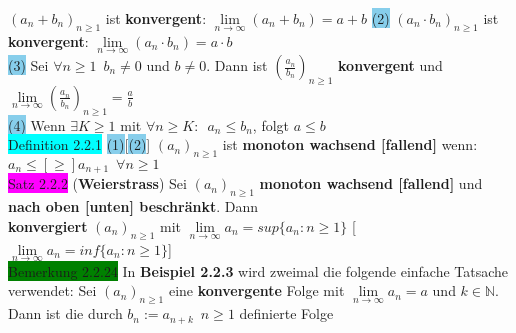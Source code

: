 \documentclass[10pt]{article}
\begin{document}
                \textcolor{NavyBlue}{$(a_n+b_n)_{n\geqslant 1}$} ist \textbf{konvergent}: 
                \textcolor{NavyBlue}{$\lim\limits_{n\to\infty}(a_n+b_n)=a+b$}
                \quad \colorbox{SkyBlue}{(2)} 
                \textcolor{NavyBlue}{$(a_n\cdot b_n)_{n\geqslant 1}$} ist \textbf{konvergent}: 
                \textcolor{NavyBlue}{$\lim\limits_{n\to\infty}(a_n\cdot b_n)=a\cdot b$}\\
        \indent \colorbox{SkyBlue}{(3)} Sei 
                \textcolor{NavyBlue}{$\forall n\geqslant 1\enspace b_n\neq 0$} und 
                \textcolor{NavyBlue}{$b\neq 0$}. 
                Dann ist \textcolor{NavyBlue}{$(\frac{a_n}{b_n})_{n\geqslant 1}$} 
                \textbf{konvergent} und 
                \textcolor{NavyBlue}{
                $\lim\limits_{n\to\infty}(\frac{a_n}{b_n})_{n\geqslant 1}=\frac{a}{b}$}\\
        \indent \colorbox{SkyBlue}{(4)} Wenn \textcolor{NavyBlue}{$\exists K\geqslant 1$} 
                mit \textcolor{NavyBlue}{$\forall n\geqslant K: \enspace a_n\leqslant b_n$}, 
                folgt \textcolor{NavyBlue}{$a\leqslant b$}\\
\colorbox{cyan}{Definition 2.2.1} \enspace \colorbox{SkyBlue}{(1)}[\colorbox{SkyBlue}{(2)}] 
                $(a_n)_{n\geqslant 1}$ ist \textbf{monoton
                wachsend [fallend]} wenn: \textcolor{NavyBlue}{
                $a_n\leqslant[\geqslant]a_{n+1}\enspace\forall n\geqslant1$}\\
\colorbox{magenta}{Satz 2.2.2} (\textbf{Weierstrass}) Sei 
                \textcolor{NavyBlue}{$(a_n)_{n\geqslant 1}$}
                \textbf{monoton wachsend 
                [fallend]} und \textbf{nach oben [unten] beschränkt}. Dann \\
        \indent \textbf{konvergiert} 
                \textcolor{NavyBlue}{$(a_n)_{n\geqslant 1}$} mit 
                \textcolor{NavyBlue}{$\lim\limits_{n\to\infty}a_n=sup\{a_n:n\geqslant 1\}$}
                [\textcolor{NavyBlue}{$\lim\limits_{n\to\infty}a_n=inf\{a_n:n\geqslant 1\}$}]\\
\colorbox{green}{Bemerkung 2.2.24} In \textbf{Beispiel 2.2.3} wird zweimal die 
                folgende einfache Tatsache verwendet: Sei 
                \textcolor{NavyBlue}{$(a_n)_{n\geqslant1}$} eine 
        \indent \textbf{konvergente} Folge mit 
                \textcolor{NavyBlue}{$\lim\limits_{n\to\infty}a_n=a$}
                und 
                \textcolor{NavyBlue}{$k\in\mathbb{N}$}. Dann ist die durch 
                \textcolor{NavyBlue}{$b_n:=a_{n+k}\enspace n\geqslant1$} definierte Folge \\
\end{document}
